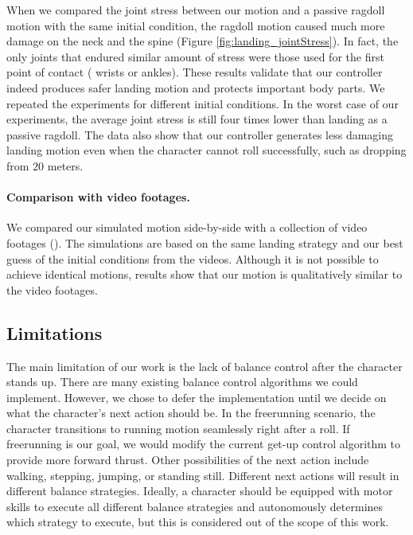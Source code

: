 


When we compared the joint stress between our motion and a passive
ragdoll motion with the same initial condition, the ragdoll motion
caused much more damage on the neck and the spine (Figure
\ref{fig:landing_jointStress}). In fact, the only joints that endured similar
amount of stress were those used for the first point of contact (\eg
wrists or ankles). These results validate that our controller indeed
produces safer landing motion and protects important body parts. We
repeated the experiments for different initial conditions.  In the
worst case of our experiments, the average joint stress is still four
times lower than landing as a passive ragdoll. The data also show that
our controller generates less damaging landing motion even when the
character cannot roll successfully, such as dropping from $20$ meters.


\paragraph{Comparison with video footages.}
We compared our simulated motion side-by-side with a collection of
video footages (\cite{APR:2011:URL}).  The simulations are based on the
same landing strategy and our best guess of the initial conditions from
the videos. Although it is not possible to achieve identical motions,
results show that our motion is qualitatively similar to the video
footages.

\subsection{Limitations}
The main limitation of our work is the lack of balance control after
the character stands up. There are many existing balance control
algorithms we could implement. However, we chose to defer the
implementation until we decide on what the character's next action
should be. In the freerunning scenario, the character transitions to
running motion seamlessly right after a roll. If freerunning is our goal, we
would modify the current get-up control algorithm to provide more
forward thrust. Other possibilities of the next action include
walking, stepping, jumping, or standing still. Different next actions
will result in different balance strategies. Ideally, a character
should be equipped with motor skills to execute all different balance
strategies and autonomously determines which strategy to execute, but
this is considered out of the scope of this work.

